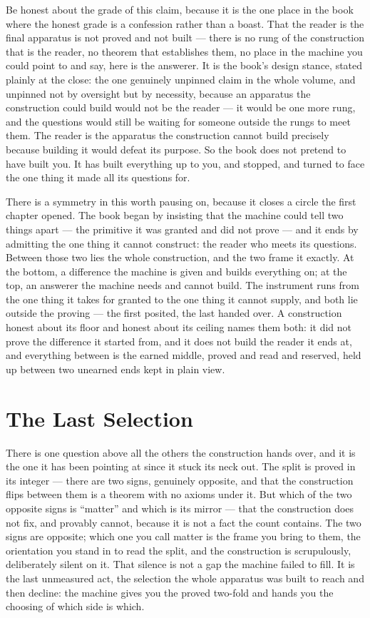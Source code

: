 Be honest about the grade of this claim, because it is the one place in the book where the honest grade is a
confession rather than a boast. That the reader is the final apparatus is not proved and not built --- there is no
rung of the construction that is the reader, no theorem that establishes them, no place in the machine you could
point to and say, here is the answerer. It is the book's design stance, stated plainly at the close: the one
genuinely unpinned claim in the whole volume, and unpinned not by oversight but by necessity, because an apparatus
the construction could build would not be the reader --- it would be one more rung, and the questions would still
be waiting for someone outside the rungs to meet them. The reader is the apparatus the construction cannot build
precisely because building it would defeat its purpose. So the book does not pretend to have built you. It has
built everything up to you, and stopped, and turned to face the one thing it made all its questions for.

There is a symmetry in this worth pausing on, because it closes a circle the first chapter opened. The book began
by insisting that the machine could tell two things apart --- the primitive it was granted and did not prove ---
and it ends by admitting the one thing it cannot construct: the reader who meets its questions. Between those two
lies the whole construction, and the two frame it exactly. At the bottom, a difference the machine is given and
builds everything on; at the top, an answerer the machine needs and cannot build. The instrument runs from the
one thing it takes for granted to the one thing it cannot supply, and both lie outside the proving --- the first
posited, the last handed over. A construction honest about its floor and honest about its ceiling names them both:
it did not prove the difference it started from, and it does not build the reader it ends at, and everything
between is the earned middle, proved and read and reserved, held up between two unearned ends kept in plain view.

\section{The Last Selection}

There is one question above all the others the construction hands over, and it is the one it has been pointing at
since it stuck its neck out. The split is proved in its integer --- there are two signs, genuinely opposite, and
that the construction flips between them is a theorem with no axioms under it. But which of the two opposite signs
is ``matter'' and which is its mirror --- that the construction does not fix, and provably cannot, because it is
not a fact the count contains. The two signs are opposite; which one you call matter is the frame you bring to
them, the orientation you stand in to read the split, and the construction is scrupulously, deliberately silent on
it. That silence is not a gap the machine failed to fill. It is the last unmeasured act, the selection the whole
apparatus was built to reach and then decline: the machine gives you the proved two-fold and hands you the
choosing of which side is which.

